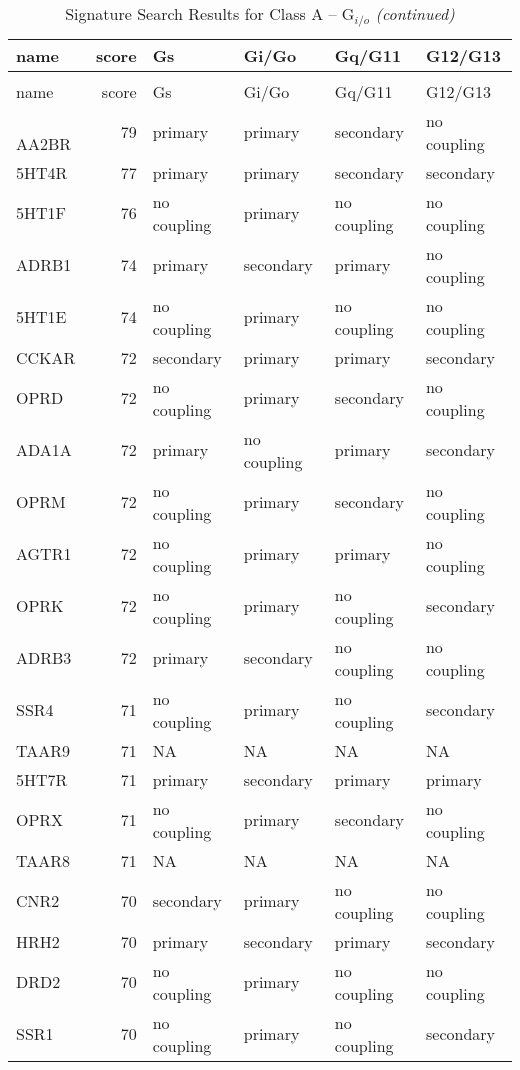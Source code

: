 
\begin{longtable}{lrllll}
\caption{\label{tab:}Signature Search Results for Class A – G$_{i/o}$}\\
\toprule
name & score & Gs & Gi/Go & Gq/G11 & G12/G13\\
\midrule
\endfirsthead
\caption[]{Signature Search Results for Class A – G$_{i/o}$ \textit{(continued)}}\\
\toprule
name & score & Gs & Gi/Go & Gq/G11 & G12/G13\\
\midrule
\endhead
\
\endfoot
\bottomrule
\endlastfoot
AA2BR & 79 & primary & primary & secondary & no coupling\\
5HT4R & 77 & primary & primary & secondary & secondary\\
5HT1F & 76 & no coupling & primary & no coupling & no coupling\\
ADRB1 & 74 & primary & secondary & primary & no coupling\\
5HT1E & 74 & no coupling & primary & no coupling & no coupling\\
\addlinespace
CCKAR & 72 & secondary & primary & primary & secondary\\
OPRD & 72 & no coupling & primary & secondary & no coupling\\
ADA1A & 72 & primary & no coupling & primary & secondary\\
OPRM & 72 & no coupling & primary & secondary & no coupling\\
AGTR1 & 72 & no coupling & primary & primary & no coupling\\
\addlinespace
OPRK & 72 & no coupling & primary & no coupling & secondary\\
ADRB3 & 72 & primary & secondary & no coupling & no coupling\\
SSR4 & 71 & no coupling & primary & no coupling & secondary\\
TAAR9 & 71 & NA & NA & NA & NA\\
5HT7R & 71 & primary & secondary & primary & primary\\
\addlinespace
OPRX & 71 & no coupling & primary & secondary & no coupling\\
TAAR8 & 71 & NA & NA & NA & NA\\
CNR2 & 70 & secondary & primary & no coupling & no coupling\\
HRH2 & 70 & primary & secondary & primary & secondary\\
DRD2 & 70 & no coupling & primary & no coupling & no coupling\\
\addlinespace
SSR1 & 70 & no coupling & primary & no coupling & secondary\\

\end{longtable}
